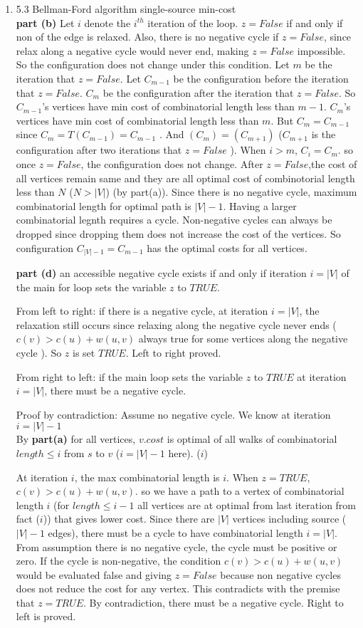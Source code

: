 \documentclass[11pt]{article}
\begin{document}
\begin{enumerate}
\item 5.3 Bellman-Ford algorithm single-source min-cost\\
\textbf{part (b)}
Let $i$ denote the $i^{th}$ iteration of the loop. $z = False$ if and only if non of the edge is relaxed. Also, there is no negative cycle if $z=False$, since relax along a negative cycle would never end, making $z=False$ impossible.  So the configuration does not change under this condition. Let $m$ be the iteration that $z=False$. Let $C_{m-1}$ be the configuration before the iteration that $ z= False$. $C_m$ be the configuration after the iteration that $z = False$. So $C_{m-1}$'s vertices have min cost of combinatorial length less than $m-1$. $C_m$'s vertices have min cost of combinatorial length less than $m$. But $C_m = C_{m-1}$ since $C_m = T(C_{m-1}) = C_{m-1}$ . And $(C_m) = (C_{m+1})$ ($C_{m+1}$ is the configuration after two iterations that $z = False$ ). When $i>m$, $C_i = C_m$. so once $z=False$, the configuration does not change. After $z=False$,the cost of all vertices remain same and they are all optimal cost of combinotorial length less than $N$ ($N>|V|$) (by part(a)). Since there is no negative cycle, maximum combinatorial length for optimal path is $|V|-1$. Having a larger combinatorial legnth requires a cycle. Non-negative cycles can always be dropped since dropping them does not increase the cost of the vertices. So configuration $C_{|V|-1} = C_{m-1}$ has the optimal costs for all vertices.  

\textbf{part (d)}
an accessible negative cycle exists if and only if iteration $i=|V|$ of the main for loop sets the variable $z$ to $TRUE$.

From left to right: if there is a negative cycle, at iteration $i=|V|$, the relaxation still occurs since relaxing along the negative cycle never ends ($c(v) > c(u) + w(u,v)$ always true for some vertices along the negative cycle ). So $z$ is set $TRUE$. Left to right proved. 

From right to left: if the main loop sets the variable $z$ to $TRUE$ at iteration $i=|V|$, there must be a negative cycle.

Proof by contradiction:
Assume no negative cycle. We know at iteration $i=|V|-1$\\
By \textbf{part(a)} for all vertices, $v.cost$ is optimal of all walks of combinatorial $length \leq i$ from $s$ to $v$ ($i=|V|-1$ here). ($i$)

At iteration $i$, the max combinatorial length is $i$. When $z=TRUE$, $c(v)>c(u) + w(u,v)$. so we have a path to a vertex of combinatorial length $i$ (for $length \leq i-1$ all vertices are at optimal from last iteration from fact ($i$)) that gives lower cost. Since there are $|V|$ vertices including source ($|V|-1$ edges), there must be a cycle to have combinatorial length $i=|V|$. From assumption there is no negative cycle, the cycle must be positive or zero. If the cycle is non-negative, the condition $c(v)>c(u) + w(u,v)$ would be evaluated false and giving $z=False$ because non negative cycles does not reduce the cost for any vertex. This contradicts with the premise that $z=TRUE$. By contradiction, there must be a negative cycle. Right to left is proved.     




\end{enumerate}
\end{document}
